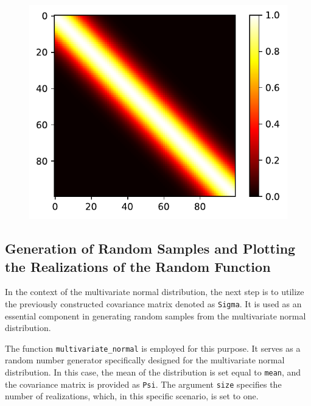 \documentclass[
  letterpaper,
  DIV=11,
  numbers=noendperiod]{scrreprt}
\begin{document}
\begin{figure}[H]

{\centering \includegraphics{006_num_gp_files/figure-pdf/cell-35-output-1.pdf}

}

\end{figure}

\hypertarget{generation-of-random-samples-and-plotting-the-realizations-of-the-random-function}{%
\subsection{Generation of Random Samples and Plotting the Realizations
of the Random
Function}\label{generation-of-random-samples-and-plotting-the-realizations-of-the-random-function}}

In the context of the multivariate normal distribution, the next step is
to utilize the previously constructed covariance matrix denoted as
\texttt{Sigma}. It is used as an essential component in generating
random samples from the multivariate normal distribution.

The function \texttt{multivariate\_normal} is employed for this purpose.
It serves as a random number generator specifically designed for the
multivariate normal distribution. In this case, the mean of the
distribution is set equal to \texttt{mean}, and the covariance matrix is
provided as \texttt{Psi}. The argument \texttt{size} specifies the
number of realizations, which, in this specific scenario, is set to one.
\end{document}
